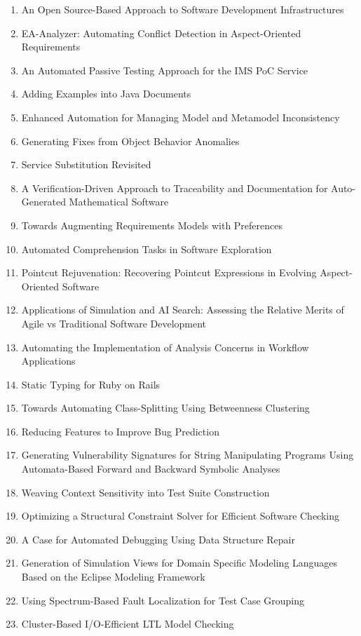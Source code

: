 \begin{enumerate}[itemsep=-1ex]
  \item An Open Source-Based Approach to Software Development Infrastructures
  \item EA-Analyzer: Automating Conflict Detection in Aspect-Oriented Requirements
  \item An Automated Passive Testing Approach for the IMS PoC Service
  \item Adding Examples into Java Documents
  \item Enhanced Automation for Managing Model and Metamodel Inconsistency
  \item Generating Fixes from Object Behavior Anomalies
  \item Service Substitution Revisited
  \item A Verification-Driven Approach to Traceability and Documentation for Auto-Generated Mathematical Software
  \item Towards Augmenting Requirements Models with Preferences
  \item Automated Comprehension Tasks in Software Exploration
  \item Pointcut Rejuvenation: Recovering Pointcut Expressions in Evolving Aspect-Oriented Software
  \item Applications of Simulation and AI Search: Assessing the Relative Merits of Agile vs Traditional Software Development
  \item Automating the Implementation of Analysis Concerns in Workflow Applications
  \item Static Typing for Ruby on Rails
  \item Towards Automating Class-Splitting Using Betweenness Clustering
  \item Reducing Features to Improve Bug Prediction
  \item Generating Vulnerability Signatures for String Manipulating Programs Using Automata-Based Forward and Backward Symbolic Analyses
  \item Weaving Context Sensitivity into Test Suite Construction
  \item Optimizing a Structural Constraint Solver for Efficient Software Checking
  \item A Case for Automated Debugging Using Data Structure Repair
  \item Generation of Simulation Views for Domain Specific Modeling Languages Based on the Eclipse Modeling Framework
  \item Using Spectrum-Based Fault Localization for Test Case Grouping
  \item Cluster-Based I/O-Efficient LTL Model Checking

\end{enumerate}
